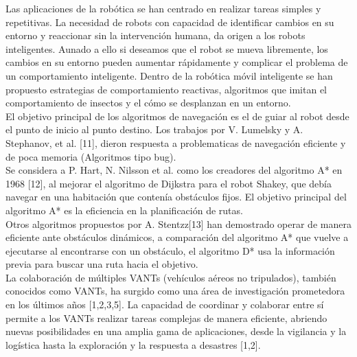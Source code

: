 \documentclass[11pt,epsf,times]{article}
\begin{document}
\vspace{1cm}

Las aplicaciones de la rob\'{o}tica se han centrado en realizar tareas simples y repetitivas. La necesidad de robots con capacidad de identificar cambios en su entorno y reaccionar sin la intervenci\'{o}n humana, da origen a los robots inteligentes. Aunado a ello si deseamos que el robot se mueva libremente, los cambios en su entorno pueden aumentar r\'{a}pidamente y complicar el problema de un comportamiento inteligente. Dentro de la rob\'{o}tica m\'{o}vil inteligente se han propuesto estrategias de comportamiento reactivas, algoritmos que imitan el comportamiento de insectos y el c\'{o}mo se desplanzan en un entorno.\\
El objetivo principal de los algoritmos de navegaci\'{o}n es el de guiar al robot desde el punto de inicio al punto destino. Los trabajos por V. Lumelsky y A. Stephanov, et al. [11], dieron respuesta a problematicas de navegaci\'{o}n eficiente y de poca memoria (Algoritmos tipo bug).\\
Se considera a P. Hart, N. Nilsson et al. como los creadores del algoritmo A* en 1968 [12], al mejorar el algoritmo de Dijkstra para el robot Shakey, que deb\'{i}a navegar en una habitaci\'{o}n que conten\'{i}a obst\'{a}culos fijos. El objetivo principal del algoritmo A* es la eficiencia en la planificaci\'{o}n de rutas.\\
Otros algoritmos propuestos por A. Stentzz[13] han demostrado operar de manera eficiente ante obst\'{a}culos din\'{a}micos, a comparaci\'{o}n del algoritmo A* que vuelve a ejecutarse al encontrarse con un obst\'{a}culo, el algoritmo D* usa la informaci\'{o}n previa para buscar una ruta hacia el objetivo.\\


La colaboraci\'{o}n de m\'{u}ltiples VANTs (veh\'{i}culos a\'{e}reos no tripulados), tambi\'{e}n conocidos como VANTs, ha surgido como una \'{a}rea de investigaci\'{o}n prometedora en los \'{u}ltimos a\~{n}os [1,2,3,5]. La capacidad de coordinar y colaborar entre s\'{i} permite a los VANTs realizar tareas complejas de manera eficiente, abriendo nuevas posibilidades en una amplia gama de aplicaciones, desde la vigilancia y la log\'{i}stica hasta la exploraci\'{o}n y la respuesta a desastres [1,2].\\
\end{document}
